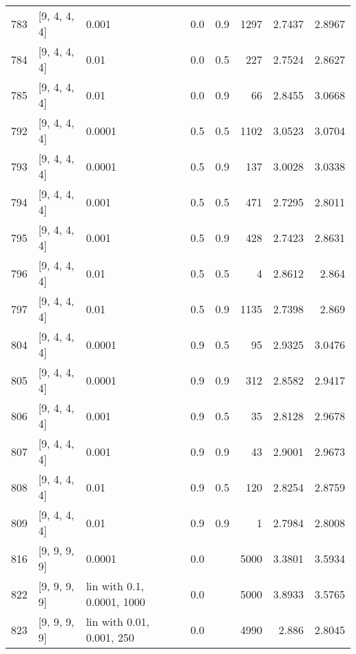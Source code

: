 \begin{longtable}{lllrrrrr}
  783 &       [9, 4, 4, 4] &                       0.001 &      0.0 & 0.9 & 1297 &   2.7437 &   2.8967 \\
  784 &       [9, 4, 4, 4] &                        0.01 &      0.0 & 0.5 &  227 &   2.7524 &   2.8627 \\
  785 &       [9, 4, 4, 4] &                        0.01 &      0.0 & 0.9 &   66 &   2.8455 &   3.0668 \\
  792 &       [9, 4, 4, 4] &                      0.0001 &      0.5 & 0.5 & 1102 &   3.0523 &   3.0704 \\
  793 &       [9, 4, 4, 4] &                      0.0001 &      0.5 & 0.9 &  137 &   3.0028 &   3.0338 \\
  794 &       [9, 4, 4, 4] &                       0.001 &      0.5 & 0.5 &  471 &   2.7295 &   2.8011 \\
  795 &       [9, 4, 4, 4] &                       0.001 &      0.5 & 0.9 &  428 &   2.7423 &   2.8631 \\
  796 &       [9, 4, 4, 4] &                        0.01 &      0.5 & 0.5 &    4 &   2.8612 &    2.864 \\
  797 &       [9, 4, 4, 4] &                        0.01 &      0.5 & 0.9 & 1135 &   2.7398 &    2.869 \\
  804 &       [9, 4, 4, 4] &                      0.0001 &      0.9 & 0.5 &   95 &   2.9325 &   3.0476 \\
  805 &       [9, 4, 4, 4] &                      0.0001 &      0.9 & 0.9 &  312 &   2.8582 &   2.9417 \\
  806 &       [9, 4, 4, 4] &                       0.001 &      0.9 & 0.5 &   35 &   2.8128 &   2.9678 \\
  807 &       [9, 4, 4, 4] &                       0.001 &      0.9 & 0.9 &   43 &   2.9001 &   2.9673 \\
  808 &       [9, 4, 4, 4] &                        0.01 &      0.9 & 0.5 &  120 &   2.8254 &   2.8759 \\
  809 &       [9, 4, 4, 4] &                        0.01 &      0.9 & 0.9 &    1 &   2.7984 &   2.8008 \\
  816 &       [9, 9, 9, 9] &                      0.0001 &      0.0 &     & 5000 &   3.3801 &   3.5934 \\
  822 &       [9, 9, 9, 9] &  lin with 0.1, 0.0001, 1000 &      0.0 &     & 5000 &   3.8933 &   3.5765 \\
  823 &       [9, 9, 9, 9] &   lin with 0.01, 0.001, 250 &      0.0 &     & 4990 &    2.886 &   2.8045 \\

\end{longtable}
